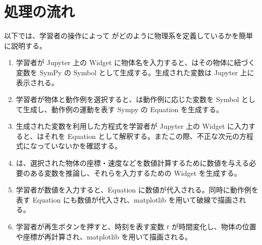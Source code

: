 



\newpage
\section{処理の流れ}
以下では、学習者の操作によって \simname がどのように物理系を定義しているかを簡単に説明する。

\begin{enumerate}
  \item 学習者が Jupyter 上の Widget に物体名を入力すると、\simname はその物体に紐づく変数を SymPy の Symbol として生成する。生成された変数は Jupyter 上に表示される。
  \item 学習者が物体と動作例を選択すると、\simname は動作例に応じた変数を Symbol として生成し、動作例の運動を表す Sympy の Equation を生成する。
  \item 生成された変数を利用した方程式を学習者が Jupyter 上の Widget に入力すると、\simname はそれを Equation として解釈する。またこの際、不正な次元の方程式になっていないかを確認する。 \label{未実装1}
  \item \simname は、選択された物体の座標・速度などを数値計算するために数値を与える必要のある変数を推論し、それらを入力するための Widget を生成する。 \label{未実装2}
  \item 学習者が数値を入力すると、Equation に数値が代入される。同時に動作例を表す Equation にも数値が代入され、matplotlib を用いて破線で描画される。
  \item 学習者が再生ボタンを押すと、時刻を表す変数 $t$ が時間変化し、物体の位置や座標が再計算され、matplotlib を用いて描画される。
\end{enumerate}

